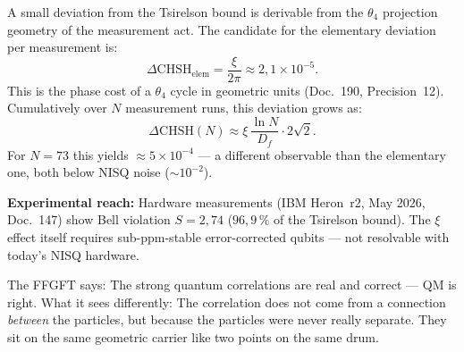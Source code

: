A small deviation from the Tsirelson bound is derivable from the
$\theta_4$ projection geometry of the measurement act. The
candidate for the elementary deviation per measurement is:
\begin{equation}
  \Delta\mathrm{CHSH}_{\mathrm{elem}} = \frac{\xi}{2\pi}
  \approx 2{,}1\times10^{-5}.
\end{equation}
This is the phase cost of a $\theta_4$ cycle in geometric
units (Doc.~190, Precision~12). Cumulatively over $N$ measurement runs,
this deviation grows as:
\begin{equation}
  \Delta\mathrm{CHSH}(N) \approx \xi\,\frac{\ln N}{D_f}\cdot2\sqrt2.
\end{equation}
For $N=73$ this yields $\approx5\times10^{-4}$ — a different
observable than the elementary one, both below NISQ noise
($\sim10^{-2}$).

\textbf{Experimental reach:} Hardware measurements (IBM Heron~r2,
May 2026, Doc.~147) show Bell violation $S=2{,}74$ ($96{,}9\,\%$
of the Tsirelson bound). The $\xi$ effect itself requires
sub-ppm-stable error-corrected qubits — not resolvable with today's
NISQ hardware.

\begin{laierspur}
The FFGFT says: The strong quantum correlations are real and
correct — QM is right. What it sees differently: The correlation
does not come from a connection \emph{between} the particles,
but because the particles were never really separate. They sit
on the same geometric carrier like two points on the same
drum.
\end{laierspur}
